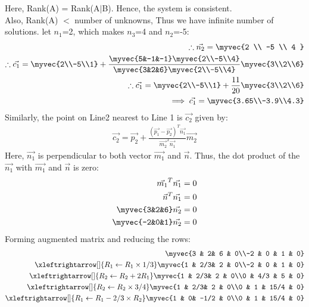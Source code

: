 \documentclass[journal,12pt,twocolumn]{IEEEtran}
\begin{document}
Here, Rank(A) = Rank(A$\mid$B). Hence, the system is consistent. 
\\
Also, Rank(A) $<$ number of unknowns, Thus we have infinite number of solutions. let $n_1$=2, which makes $n_3$=4 and $n_2$=-5:
\begin{align}
    \therefore \vec{n_2}=\myvec{2 \\ -5 \\ 4 }\\
\therefore \vec{c_1}= \myvec{2\\-5\\1}+\frac{\myvec{5&-1&-1} \myvec{2\\-5\\4}}{\myvec{3&2&6} \myvec{2\\-5\\4}}\myvec{3\\2\\6}\\
\therefore \vec{c_1}= \myvec{2\\-5\\1}+\frac{11}{20}\myvec{3\\2\\6}\\
\implies \vec{c_1}=\myvec{3.65\\-3.9\\4.3}
\end{align}
Similarly, the point on Line2 nearest to Line 1 is $\vec{c_2}$ given by:\\
\begin{align}
\vec{c_2}=\vec{p_2}+\frac{(\vec{p_1}-\vec{p_2})^T \vec{n_1}}{\vec{m_2}^T \vec{n_1}}\vec{m_2}
\end{align}
Here, $\Vec{n_1}$ is perpendicular to both vector $\Vec{m_1}$ and $\Vec{n}$. Thus, the dot product of the $\Vec{n_1}$ with $\Vec{m_1}$ and $\Vec{n}$ is zero:
\begin{align}
    \vec{m_1}^T\vec{n_1} =  0\\
    \vec{n}^T\vec{n_1} =  0\\
    \myvec{3&2&6}\vec{n_2}=0\\
    \myvec{-2&0&1}\vec{n_2}=0
\end{align}
Forming augmented matrix and reducing the rows:
\begin{align}
\myvec{3 & 2& 6 & 0\\-2 & 0 & 1 & 0}\\
\xleftrightarrow[]{R_1\leftarrow R_1\times1/3}
\myvec{1 & 2/3& 2 & 0\\-2 & 0 & 1 & 0}\\
\xleftrightarrow[]{R_2\leftarrow R_2+2R_1}
\myvec{1 & 2/3& 2 & 0\\0 & 4/3 & 5 & 0}\\
\xleftrightarrow[]{R_2\leftarrow R_2\times 3/4}
\myvec{1 & 2/3& 2 & 0\\0 & 1 & 15/4 & 0}\\
\xleftrightarrow[]{R_1\leftarrow R_1-2/3\times R_2}
\myvec{1 & 0& -1/2 & 0\\0 & 1 & 15/4 & 0}\\
\end{align} 
\end{document}
